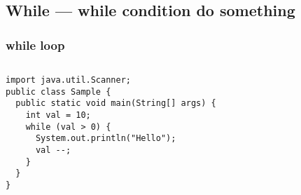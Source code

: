 \documentclass[en, 11pt, xcolor=dvipsnames]{beamer}
\begin{document}
\subsection{While --- while condition do something}
\begin{frame}[fragile]
	\frametitle{while loop}



	\begin{columns}[c]
		\begin{column}{0.9\textwidth}

			\begin{lstlisting}[style=Java]
import java.util.Scanner;
public class Sample {
  public static void main(String[] args) {
    int val = 10;
    while (val > 0) {
      System.out.println("Hello");
      val --;
    }
  }
}\end{lstlisting}

		\end{column}
	\end{columns}

\end{frame}
\end{document}
